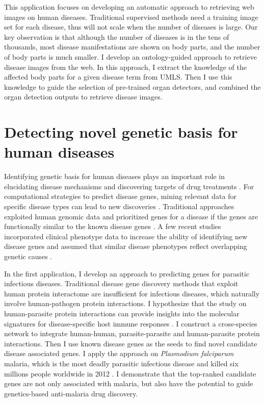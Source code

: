 This application focuses on developing an automatic approach to retrieving
web images on human diseases.
Traditional supervised methods need a training
image set for each disease, thus will not scale when the number of diseases is large.
Our key observation is that although the
number of diseases is in the tens of thousands, most disease manifestations are
shown on body parts, and the number of body parts is much smaller.
I develop an ontology-guided approach to retrieve disease images from the web.
In this approach, I extract the knowledge of the affected body parts for a given disease term from UMLS.
Then I use this knowledge to guide the selection of pre-trained organ detectors, and
combined the organ detection outputs to retrieve disease images.


\section{Detecting novel genetic basis for human diseases}
Identifying genetic basis for human diseases plays
an important role in elucidating disease mechanisms
and discovering targets of drug treatments \cite{Plenge,Hurle}.
For computational strategies to predict disease genes,
mining relevant data for specific disease types can lead to new discoveries
\cite{barabasi2011network,Tiffin,Piro}.
Traditional approaches exploited human genomic data and prioritized genes
for a disease if the genes are functionally similar to
the known disease genes \cite{kohler2008walking,Xu,franke2006reconstruction,aerts2006gene}.
A few recent studies incorporated clinical phenotype data
to increase the ability of identifying new disease genes
\cite{lage2007human,li2010genome,wu2008network,wu2009align,vanunu2010associating,hwang2012co}
and assumed that similar disease phenotypes reflect overlapping genetic
causes \cite{brunner2004syndrome,oti2008phenome,houle2010phenomics}.

In the first application, I develop an approach to
predicting genes for parasitic infectious diseases.
Traditional disease gene discovery methods that exploit human protein
interactome are insufficient for infectious diseases,
which naturally involve human-pathogen protein interactions.
I hypothesize that the study on human-parasite protein interactions can
provide insights into the molecular signatures
for disease-specific host immune responses
\cite{wu2014strain, khor2011revealing,
janes2011investigating}.
I construct a cross-species network
to integrate human-human, parasite-parasite and human-parasite protein
interactions. Then I use known disease genes as the seeds to find novel candidate disease associated genes.
I apply the approach on {\it Plasmodium falciparum} malaria, which is the most deadly parasitic
infectious disease and killed six millions people worldwide in 2012 \cite{who}.
I demonstrate that the top-ranked candidate genes are not only associated with malaria, but also
have the potential to guide genetics-based anti-malaria drug discovery.

